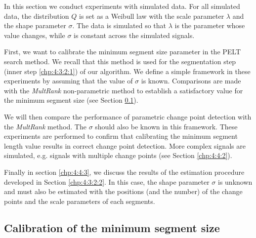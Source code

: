 In this section we conduct experiments with simulated data. For all simulated data, the distribution $Q$ is set as a Weibull law with the scale parameter $\lambda$ and the shape parameter $\sigma$. The data is simulated so that $\lambda$ is the parameter whose value changes, while $\sigma$ is constant across the simulated signals.  

First, we want to calibrate the minimum segment size parameter in the PELT search method. We recall that this method is used for the segmentation step (inner step \ref{chp:4:3:2:1}) of our algorithm. We define a simple framework in these experiments by assuming that the value of $\sigma$ is known. Comparisons are made with the \textit{MultRank} non-parametric method \citep{lung2015} to establish a satisfactory value for the minimum segment size (see Section \ref{chp:4:4:1}).  

We will then compare the performance of parametric change point detection with the \textit{MultRank} method. The $\sigma$ should also be known in this framework. These experiments are performed to confirm that calibrating the minimum segment length value results in correct change point detection. More complex signals are simulated, e.g. signals with multiple change points (see Section \ref{chp:4:4:2}).  

Finally in section \ref{chp:4:4:3}, we discuss the results of the estimation procedure developed in Section \ref{chp:4:3:2:2}. In this case, the shape parameter $\sigma$ is unknown and must also be estimated with the positions (and the number) of the change points and the scale parameters of each segments. 

\subsection{Calibration of the minimum segment size}\label{chp:4:4:1}


 

